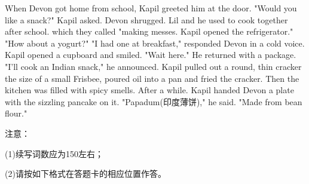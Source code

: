 \documentclass{英语试卷}
\begin{document}
\par When Devon got home from school, Kapil greeted him at the door. "Would you like a snack?" Kapil asked. Devon shrugged. Lil and he used to cook together after school. which they called "making messes. Kapil opened the refrigerator." "How about a yogurt?" "I had one at breakfast," responded Devon in a cold voice. Kapil opened a cupboard and smiled. "Wait here." He returned with a package. "I’ll cook an Indian snack," he announced. Kapil pulled out a round, thin cracker the size of a small Frisbee, poured oil into a pan and fried the cracker. Then the kitchen was filled with spicy smells. After a while. Kapil handed Devon a plate with the sizzling pancake on it. "Papadum(印度薄饼)," he said. "Made from bean flour."\par
\par 注意：\par
\par (1)续写词数应为150左右；\par
\par (2)请按如下格式在答题卡的相应位置作答。\par
{}
\end{document}
